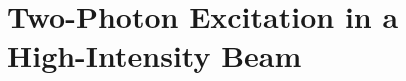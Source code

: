 \chapter[Two-Photon Excitation in a High-Intensity Beam]
  {Two-Photon Excitation in a\\ High-Intensity Beam}
  \label{chp:twophoton}

  

  

  

  

  